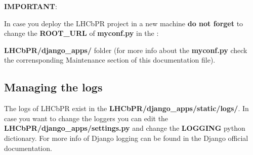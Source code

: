\documentclass{lhcbnote}
\begin{document}
{\bf IMPORTANT}:

In case you deploy the LHCbPR project in a new machine {\bf do not forget} to change the {\bf ROOT\_URL} of {\bf myconf.py} in the :

{\bf LHCbPR/django\_apps/} folder (for more info about the {\bf myconf.py} check the corrensponding Maintenance section of this documentation file).

\subsection{Managing the logs}

The logs of LHCbPR exist in the {\bf LHCbPR/django\_apps/static/logs/}. In case you want to change the loggers
you can edit the {\bf LHCbPR/django\_apps/settings.py} and change the {\bf LOGGING} python dictionary. For more
info of Django logging can be found in the Django official documentation.
\end{document}
